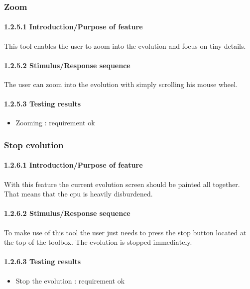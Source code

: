 \documentclass[titlepage,12pt]{scrartcl}
\begin{document}
\begin{itemize}
	
	
\end{itemize}

\subsubsection{Zoom}
\paragraph{1.2.5.1 Introduction/Purpose of feature}
This tool enables the user to zoom into the evolution and focus on tiny details.
\paragraph{1.2.5.2 Stimulus/Response sequence}
The user can zoom into the evolution with simply scrolling his mouse wheel.
\paragraph{1.2.5.3 Testing results}
\begin{itemize}
	\item Zooming															: requirement ok
\end{itemize}

\subsubsection{Stop evolution}
\paragraph{1.2.6.1 Introduction/Purpose of feature}
With this feature the current evolution screen should be painted all together. That means that the cpu is heavily disburdened.
\paragraph{1.2.6.2 Stimulus/Response sequence}
To make use of this tool the user just needs to press the stop button located at the top of the toolbox. The evolution is stopped immediately.
\paragraph{1.2.6.3 Testing results}
\begin{itemize}
	\item Stop the evolution 	: requirement ok
\end{itemize}
\end{document}
